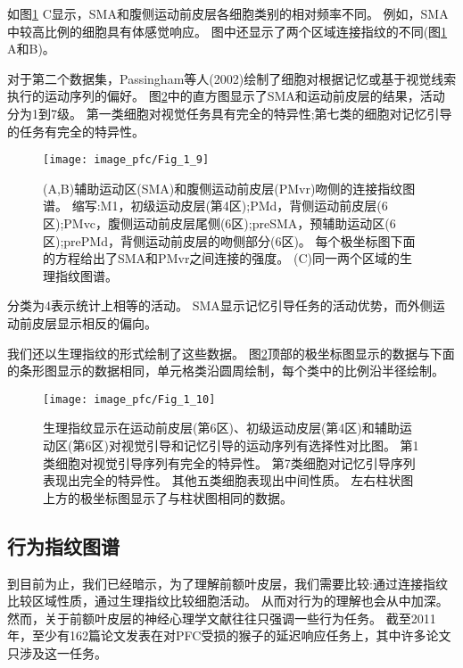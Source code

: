 \par
如图\ref{fig:1_9} C显示，SMA和腹侧运动前皮层各细胞类别的相对频率不同。
例如，SMA中较高比例的细胞具有体感觉响应。
图中还显示了两个区域连接指纹的不同(图\ref{fig:1_9} A和B)。
\par
对于第二个数据集，Passingham等人(2002)绘制了细胞对根据记忆或基于视觉线索执行的运动序列的偏好\cite{2002Dorsal,mushiake1991neuronal}。
图\ref{fig:1_10}中的直方图显示了SMA和运动前皮层的结果，活动分为1到7级。
第一类细胞对视觉任务具有完全的特异性;第七类的细胞对记忆引导的任务有完全的特异性。

\begin{figure}[!htb]
	\centering
	\texttt{[image: image\_pfc/Fig\_1\_9]}
	\caption{(A,B)辅助运动区(SMA)和腹侧运动前皮层(PMvr)吻侧的连接指纹图谱。
		缩写:M1，初级运动皮层(第4区);PMd，背侧运动前皮层(6区);PMvc，腹侧运动前皮层尾侧(6区);preSMA，预辅助运动区(6区);prePMd，背侧运动前皮层的吻侧部分(6区)。
		每个极坐标图下面的方程给出了SMA和PMvr之间连接的强度。
		(C)同一两个区域的生理指纹图谱\cite{passingham2002anatomical}。	\label{fig:1_9}}
\end{figure}


\par
分类为4表示统计上相等的活动。
SMA显示记忆引导任务的活动优势，而外侧运动前皮层显示相反的偏向。
\par
我们还以生理指纹的形式绘制了这些数据。
图\ref{fig:1_10}顶部的极坐标图显示的数据与下面的条形图显示的数据相同，单元格类沿圆周绘制，每个类中的比例沿半径绘制。

\begin{figure}[!htb]
	\centering
	\texttt{[image: image\_pfc/Fig\_1\_10]}
	\caption{生理指纹显示在运动前皮层(第6区)、初级运动皮层(第4区)和辅助运动区(第6区)对视觉引导和记忆引导的运动序列有选择性对比图。
		第1类细胞对视觉引导序列有完全的特异性。
		第7类细胞对记忆引导序列表现出完全的特异性。
		其他五类细胞表现出中间性质。
		左右柱状图上方的极坐标图显示了与柱状图相同的数据\cite{mushiake1991neuronal}。\label{fig:1_10}}
\end{figure}


\subsection{行为指纹图谱}
到目前为止，我们已经暗示，为了理解前额叶皮层，我们需要比较:通过连接指纹比较区域性质，通过生理指纹比较细胞活动。
从而对行为的理解也会从中加深。
然而，关于前额叶皮层的神经心理学文献往往只强调一些行为任务。
截至2011年，至少有162篇论文发表在对PFC受损的猴子的延迟响应任务上，其中许多论文只涉及这一任务。

